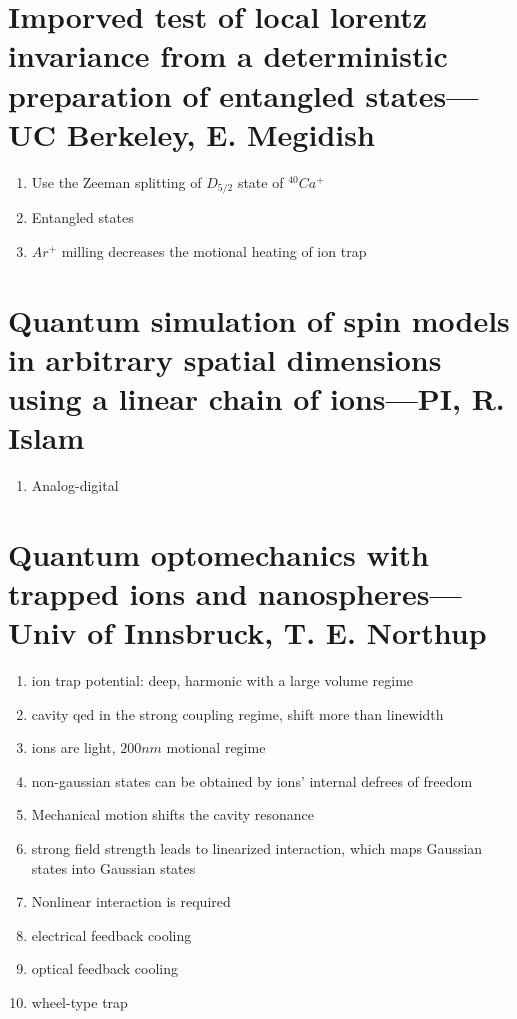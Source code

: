 \section{Imporved test of local lorentz invariance from a deterministic preparation of entangled states--- UC Berkeley, E. Megidish} %
\label{sec:imporved_test_of_local_lorentz_invariance_from_a_deterministic_preparation_of_entangled_states_uc_berkeley_e_megidish}


\begin{enumerate}
    \item Use the Zeeman splitting of $D_{5/2}$ state of $^{40}Ca^+$
    \item Entangled states
    \item $Ar^+$ milling decreases the motional heating of ion trap
\end{enumerate}




\section{Quantum simulation of spin models in arbitrary spatial dimensions using a linear chain of ions---PI, R. Islam} %
\label{sec:quantum_simulation_of_spin_models_in_arbitrary_spatial_dimensions_using_a_linear_chain_of_ions}


\begin{enumerate}
    \item Analog-digital
\end{enumerate}



\section{Quantum optomechanics with trapped ions and nanospheres---Univ of Innsbruck, T. E. Northup} %
\label{sec:quantum_optomechanics_with_trapped_ions_and_nanospheres}


\begin{enumerate}
    \item ion trap potential: deep, harmonic with a large volume regime
    \item cavity qed in the strong coupling regime, shift more than linewidth
    \item  ions are light, $200\unit{nm}$ motional regime
    \item  non-gaussian states can be obtained by ions' internal defrees of freedom
    \item Mechanical motion shifts the cavity resonance
    \item  strong field strength leads to linearized interaction, which maps Gaussian states into Gaussian states
    \item Nonlinear interaction is required
    \item electrical feedback cooling
    \item optical feedback cooling
    \item wheel-type trap
\end{enumerate}



